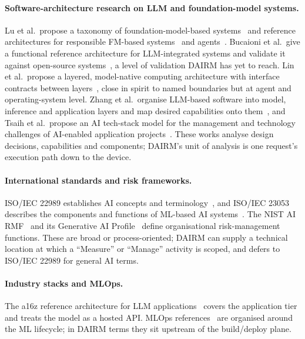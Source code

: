 \documentclass[11pt]{article}
\begin{document}
\paragraph{Software-architecture research on LLM and foundation-model systems.} Lu et al.\ propose a taxonomy of foundation-model-based systems~\cite{lu2023taxonomy} and reference architectures for responsible FM-based systems~\cite{lu2023rafm} and agents~\cite{lu2024agents}. Bucaioni et al.\ give a functional reference architecture for LLM-integrated systems and validate it against open-source systems~\cite{bucaioni2025fra}, a level of validation DAIRM has yet to reach. Lin et al.\ propose a layered, model-native computing architecture with interface contracts between layers~\cite{lin2026ica}, close in spirit to named boundaries but at agent and operating-system level. Zhang et al.\ organise LLM-based software into model, inference and application layers and map desired capabilities onto them~\cite{zhang2024layered}, and Tsaih et al.\ propose an AI tech-stack model for the management and technology challenges of AI-enabled application projects~\cite{tsaih2023stack}. These works analyse design decisions, capabilities and components; DAIRM's unit of analysis is one request's execution path down to the device.

\paragraph{International standards and risk frameworks.} ISO/IEC 22989 establishes AI concepts and terminology~\cite{iso22989}, and ISO/IEC 23053 describes the components and functions of ML-based AI systems~\cite{iso23053}. The NIST AI RMF~\cite{nist2023airmf} and its Generative AI Profile~\cite{nist2024genai} define organisational risk-management functions. These are broad or process-oriented; DAIRM can supply a technical location at which a ``Measure'' or ``Manage'' activity is scoped, and defers to ISO/IEC 22989 for general AI terms.

\paragraph{Industry stacks and MLOps.} The a16z reference architecture for LLM applications~\cite{a16z2023llm} covers the application tier and treats the model as a hosted API. MLOps references~\cite{googlemlops,kreuzberger2023mlops} are organised around the ML lifecycle; in DAIRM terms they sit upstream of the build/deploy plane.
\end{document}
